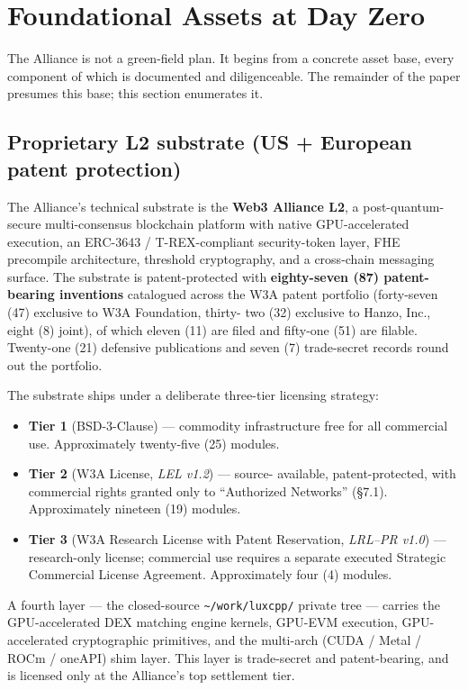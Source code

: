 \section{Foundational Assets at Day Zero}

The Alliance is not a green-field plan. It begins from a concrete asset
base, every component of which is documented and diligenceable. The
remainder of the paper presumes this base; this section enumerates it.

\subsection{Proprietary L2 substrate (US + European patent protection)}

The Alliance's technical substrate is the \textbf{Web3 Alliance L2}, a
post-quantum-secure multi-consensus blockchain platform with native
GPU-accelerated execution, an ERC-3643 / T-REX-compliant security-token
layer, FHE precompile architecture, threshold cryptography, and a
cross-chain messaging surface. The substrate is patent-protected with
\textbf{eighty-seven (87) patent-bearing inventions} catalogued across the
W3A patent portfolio (forty-seven (47) exclusive to W3A Foundation, thirty-
two (32) exclusive to Hanzo, Inc., eight (8) joint), of which eleven (11)
are filed and fifty-one (51) are filable. Twenty-one (21) defensive
publications and seven (7) trade-secret records round out the portfolio.

The substrate ships under a deliberate three-tier licensing strategy:

\begin{itemize}[leftmargin=2em,itemsep=0.1em]
\item \textbf{Tier 1} (BSD-3-Clause) --- commodity infrastructure free for
all commercial use. Approximately twenty-five (25) modules.
\item \textbf{Tier 2} (W3A License, \emph{LEL v1.2}) --- source-
available, patent-protected, with commercial rights granted only to
``Authorized Networks'' (\S 7.1). Approximately nineteen (19) modules.
\item \textbf{Tier 3} (W3A Research License with Patent Reservation,
\emph{LRL--PR v1.0}) --- research-only license; commercial use requires a
separate executed Strategic Commercial License Agreement. Approximately
four (4) modules.
\end{itemize}

A fourth layer --- the closed-source \texttt{\textasciitilde/work/luxcpp/}
private tree --- carries the GPU-accelerated DEX matching engine kernels,
GPU-EVM execution, GPU-accelerated cryptographic primitives, and the
multi-arch (CUDA / Metal / ROCm / oneAPI) shim layer. This layer is
trade-secret and patent-bearing, and is licensed only at the Alliance's
top settlement tier.

